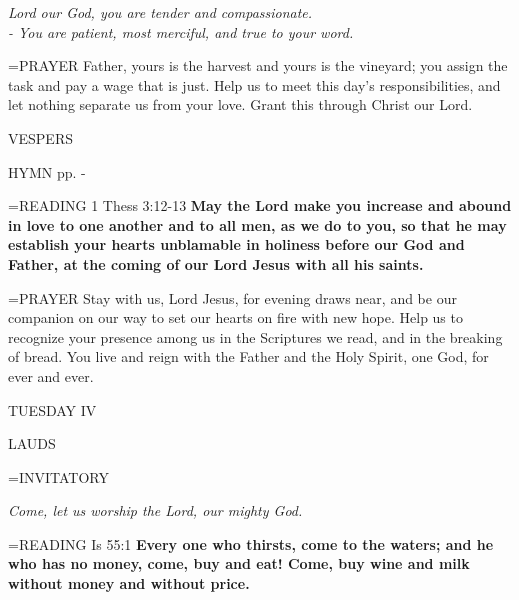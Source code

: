 \begin{center}
\textit{Lord our God, you are tender and compassionate.\\
- You are patient, most merciful, and true to your word.}
\end{center}

\hangindent=\parindent \small{PRAYER  Father, yours is the harvest and yours is the vineyard; you assign the task and pay a wage that is just. Help us to meet this day’s responsibilities, and let nothing separate us from your love. Grant this through Christ our Lord.}

\begin{flushleft}\normalsize VESPERS\\\end{flushleft}

HYMN pp. \pageref{ordinaryTime:fourthHymn} - \pageref{ordinaryTime:sixthHymn}

\hangindent=\parindent \small{READING} 1 Thess 3:12-13 \textbf{May the Lord make you increase and abound in love to one another and to all men, as we do to you, so that he may establish your hearts unblamable in holiness before our God and Father, at the coming of our Lord Jesus with all his saints.\\}

\hangindent=\parindent \small{PRAYER  Stay with us, Lord Jesus, for evening draws near, and be our companion on our way to set our hearts on fire with new hope. Help us to recognize your presence among us in the Scriptures we read, and in the breaking of bread. You live and reign with the Father and the Holy Spirit, one God, for ever and ever.}

\begin{center}
\normalsize TUESDAY IV
\end{center}

\begin{flushleft}\normalsize LAUDS\\\end{flushleft}

\hangindent=\parindent \small{INVITATORY}
\begin{center}
\textit{Come, let us worship the Lord, our mighty God.\\}
\end{center}

\hangindent=\parindent \small{READING} Is 55:1 \textbf{Every one who thirsts, come to the waters; and he who has no money, come, buy and eat! Come, buy wine and milk without money and without price.\\}

